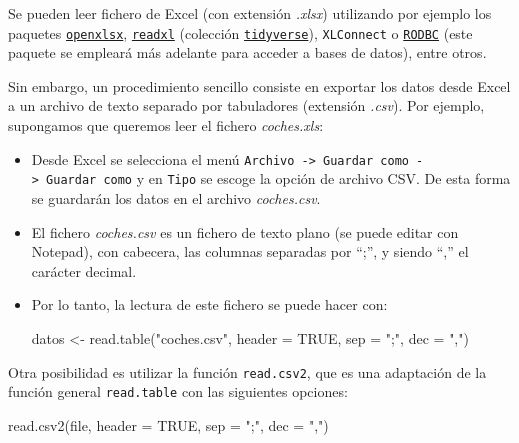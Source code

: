 \documentclass[
]{book}
\newenvironment{Shaded}{\begin{snugshade}}{\end{snugshade}}
\newcommand{\AttributeTok}[1]{\textcolor[rgb]{0.77,0.63,0.00}{#1}}
\newcommand{\ConstantTok}[1]{\textcolor[rgb]{0.00,0.00,0.00}{#1}}
\newcommand{\FunctionTok}[1]{\textcolor[rgb]{0.00,0.00,0.00}{#1}}
\newcommand{\NormalTok}[1]{#1}
\newcommand{\OtherTok}[1]{\textcolor[rgb]{0.56,0.35,0.01}{#1}}
\newcommand{\StringTok}[1]{\textcolor[rgb]{0.31,0.60,0.02}{#1}}
\theoremstyle{break}
\begin{document}
Se pueden leer fichero de
Excel (con extensión \emph{.xlsx}) utilizando por ejemplo los paquetes \href{https://cran.r-project.org/web/packages/openxlsx/index.html}{\texttt{openxlsx}}, \href{https://readxl.tidyverse.org}{\texttt{readxl}} (colección \href{https://www.tidyverse.org/}{\texttt{tidyverse}}), \texttt{XLConnect} o
\href{https://cran.r-project.org/web/packages/RODBC/index.html}{\texttt{RODBC}} (este paquete se empleará más adelante para acceder a bases de datos),
entre otros.

Sin embargo, un procedimiento sencillo consiste en exportar los datos desde Excel a un archivo
de texto separado por tabuladores (extensión \emph{.csv}).
Por ejemplo, supongamos que queremos leer el fichero \emph{coches.xls}:

\begin{itemize}
\item
  Desde Excel se selecciona el menú
  \texttt{Archivo\ -\textgreater{}\ Guardar\ como\ -\textgreater{}\ Guardar\ como} y en \texttt{Tipo} se escoge la opción de
  archivo CSV. De esta forma se guardarán los datos en el archivo
  \emph{coches.csv}.
\item
  El fichero \emph{coches.csv} es un fichero de texto plano (se puede
  editar con Notepad), con cabecera, las columnas separadas por ``;'', y
  siendo ``,'' el carácter decimal.
\item
  Por lo tanto, la lectura de este fichero se puede hacer con:

\begin{Shaded}
\begin{Highlighting}[]
\NormalTok{datos }\OtherTok{\textless{}{-}} \FunctionTok{read.table}\NormalTok{(}\StringTok{"coches.csv"}\NormalTok{, }\AttributeTok{header =} \ConstantTok{TRUE}\NormalTok{, }\AttributeTok{sep =} \StringTok{";"}\NormalTok{, }\AttributeTok{dec =} \StringTok{","}\NormalTok{)}
\end{Highlighting}
\end{Shaded}
\end{itemize}

Otra posibilidad es utilizar la función \texttt{read.csv2}, que es
una adaptación de la función general \texttt{read.table} con las siguientes
opciones:

\begin{Shaded}
\begin{Highlighting}[]
\FunctionTok{read.csv2}\NormalTok{(file, }\AttributeTok{header =} \ConstantTok{TRUE}\NormalTok{, }\AttributeTok{sep =} \StringTok{";"}\NormalTok{, }\AttributeTok{dec =} \StringTok{","}\NormalTok{)}
\end{Highlighting}
\end{Shaded}
\end{document}

